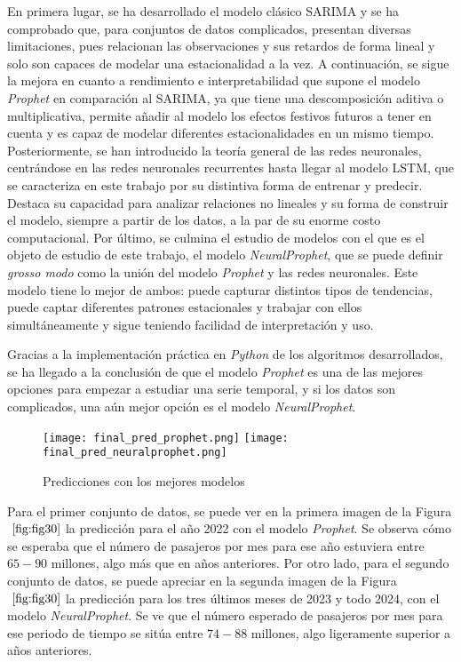 \documentclass[12pt,twoside]{article}
\begin{document}
En primera lugar, se ha desarrollado el modelo clásico SARIMA y se ha comprobado que, para conjuntos de datos complicados, presentan diversas limitaciones, pues relacionan las observaciones y sus retardos de forma lineal y solo son capaces de modelar una estacionalidad a la vez. A continuación, se sigue la mejora en cuanto a rendimiento e interpretabilidad que supone el modelo \textit{Prophet} en comparación al SARIMA, ya que tiene una descomposición aditiva o multiplicativa, permite añadir al modelo los efectos festivos futuros a tener en cuenta  y es capaz de modelar diferentes estacionalidades en un mismo tiempo. Posteriormente, se han introducido la teoría general de las redes neuronales, centrándose en las redes neuronales recurrentes hasta llegar al modelo LSTM, que se caracteriza en este trabajo por su distintiva forma de entrenar y predecir. Destaca su capacidad para analizar relaciones no lineales y su forma de construir el modelo, siempre a partir de los datos, a la par de su enorme costo computacional. Por último, se culmina el estudio de modelos  con el que es el objeto de estudio de este trabajo, el modelo \textit{NeuralProphet}, que se puede definir \textit{grosso modo} como la unión del modelo \textit{Prophet} y las redes neuronales. Este modelo tiene lo mejor de ambos: puede capturar distintos tipos de tendencias, puede captar diferentes patrones estacionales y trabajar con ellos simultáneamente y sigue teniendo facilidad de interpretación y uso.

Gracias a la implementación práctica en \textit{Python} de los algoritmos desarrollados, se ha llegado a la conclusión de que el modelo \textit{Prophet} es una de las mejores opciones para empezar a estudiar una serie temporal, y si los datos son complicados, una aún mejor opción es el modelo \textit{NeuralProphet}. 


\begin{figure}[h]
    \centering
    \texttt{[image: final\_pred\_prophet.png]}
    \texttt{[image: final\_pred\_neuralprophet.png]}
    \caption{Predicciones con los mejores modelos} 
    \label{fig:fig30}
\end{figure}

Para el primer conjunto de datos, se puede ver en la primera imagen de la Figura $~\ref{fig:fig30}$ la predicción para el año 2022 con el modelo \textit{Prophet}. Se observa cómo se esperaba que el número de pasajeros por mes para ese año estuviera entre $65-90$ millones, algo más que en años anteriores. Por otro lado, para el segundo conjunto de datos, se puede apreciar en la segunda imagen de la Figura $~\ref{fig:fig30}$ la predicción para los tres últimos meses de 2023 y todo 2024, con el modelo \textit{NeuralProphet}. Se ve que el número esperado de pasajeros por mes para ese periodo de tiempo se sitúa entre $74-88$ millones, algo ligeramente superior a años anteriores.
\end{document}
